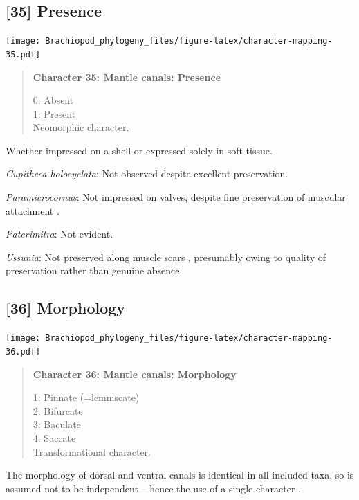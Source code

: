 \documentclass[openany]{book}
\begin{document}
\subsection*{{[}35{]} Presence}\label{presence-1}

\texttt{[image: Brachiopod\_phylogeny\_files/figure-latex/character-mapping-35.pdf]}

\begin{quote}
\textbf{Character 35: Mantle canals: Presence}

0: Absent\\
1: Present\\
Neomorphic character.
\end{quote}

Whether impressed on a shell or expressed solely in soft tissue.

\hypertarget{Cupitheca_holocyclata-coding-35}{}
\emph{Cupitheca holocyclata}: Not observed despite excellent
preservation.

\hypertarget{Paramicrocornus-coding-35}{}
\emph{Paramicrocornus}: Not impressed on valves, despite fine
preservation of muscular attachment \citep{Zhang2018Ahyolithid}.

\hypertarget{Paterimitra-coding-35}{}
\emph{Paterimitra}: Not evident.

\hypertarget{Ussunia-coding-35}{}
\emph{Ussunia}: Not preserved along muscle scars \citep{Nikitin1984},
presumably owing to quality of preservation rather than genuine absence.

\subsection*{{[}36{]} Morphology}\label{morphology-1}

\texttt{[image: Brachiopod\_phylogeny\_files/figure-latex/character-mapping-36.pdf]}

\begin{quote}
\textbf{Character 36: Mantle canals: Morphology}

1: Pinnate (=lemniscate)\\
2: Bifurcate\\
3: Baculate\\
4: Saccate\\
Transformational character.
\end{quote}

The morphology of dorsal and ventral canals is identical in all included
taxa, so is assumed not to be independent -- hence the use of a single
character \citep[contra][]{Williams2000LinguliformeaCraniiformea}.
\end{document}
